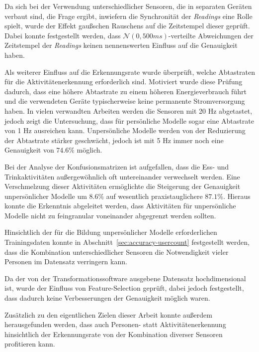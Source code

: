 Da sich bei der Verwendung unterschiedlicher Sensoren, die in separaten Geräten verbaut sind, die Frage ergibt, inwiefern die Synchronität der \textit{Readings} eine Rolle spielt, wurde der Effekt gaußschen Rauschens auf die Zeitstempel dieser geprüft. Dabei konnte festgestellt werden, dass $\mathcal{N}(0, 500ms)$-verteilte Abweichungen der Zeitstempel der \textit{Readings} keinen nennenswerten Einfluss auf die Genauigkeit haben.

Als weiterer Einfluss auf die Erkennungsrate wurde überprüft, welche Abtastraten für die Aktivitätenerkennung erforderlich sind. Motiviert wurde diese Prüfung dadurch, dass eine höhere Abtastrate zu einem höheren Energieverbrauch führt und die verwendeten Geräte typischerweise keine permanente Stromversorgung haben. In vielen verwandten Arbeiten werden die Sensoren mit 20 Hz abgetastet, jedoch zeigt die Untersuchung, dass für persönliche Modelle sogar eine Abtastrate von 1 Hz ausreichen kann. Unpersönliche Modelle werden von der Reduzierung der Abtastrate stärker geschwächt, jedoch ist mit 5 Hz immer noch eine Genauigkeit von $74.6 \%$ möglich.

Bei der Analyse der Konfusionsmatrizen ist aufgefallen, dass die Ess- und Trinkaktivitäten außergewöhnlich oft untereinander verwechselt werden. Eine Verschmelzung dieser Aktivitäten ermöglichte die Steigerung der Genauigkeit unpersönlicher Modelle um $8.6 \%$ auf wesentlich praxistauglichere $87.1 \%$. Hieraus konnte die Erkenntnis abgeleitet werden, dass Aktivitäten für unpersönliche Modelle nicht zu feingranular voneinander abgegrenzt werden sollten.

Hinsichtlich der für die Bildung unpersönlicher Modelle erforderlichen Trainingsdaten konnte in Abschnitt~\ref{sec:accuracy-usercount} festgestellt werden, dass die Kombination unterschiedlicher Sensoren die Notwendigkeit vieler Personen im Datensatz verringern kann. 

Da der von der Transformationssoftware ausgebene Datensatz hochdimensional ist, wurde der Einfluss von Feature-Selection geprüft, dabei jedoch festgestellt, dass dadurch keine Verbesserungen der Genauigkeit möglich waren.

Zusätzlich zu den eigentlichen Zielen dieser Arbeit konnte außerdem herausgefunden werden, dass auch Personen- statt Aktivitätenerkennung hinsichtlich der Erkennungsrate von der Kombination diverser Sensoren profitieren kann.

